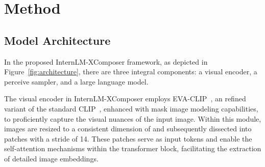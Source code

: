\documentclass[10pt,twocolumn,letterpaper]{article}
\begin{document}
\begin{table*}[t]
\centering
{}
\vspace{-5pt}
\caption {Datasets used for Supervised Fine-Tuning. }
\vspace{5pt}
\label{tab:sft data}
\end{table*}

\section{Method}

\subsection{Model Architecture}
In the proposed InternLM-XComposer framework, as depicted in Figure~\ref{fig:architecture}, there are three integral components: a visual encoder, a perceive sampler, and a large language model.

 The visual encoder in InternLM-XComposer employs EVA-CLIP~\cite{fang2023eva}, an refined variant of the standard CLIP~\cite{Yang2022ChineseCC}, enhanced with mask image modeling capabilities, to proficiently capture the visual nuances of the input image. Within this module, images are resized to a consistent dimension of  and subsequently dissected into patches with a stride of 14. These patches serve as input tokens and enable the self-attention mechanisms within the transformer block, facilitating the extraction of detailed image embeddings.
\end{document}
